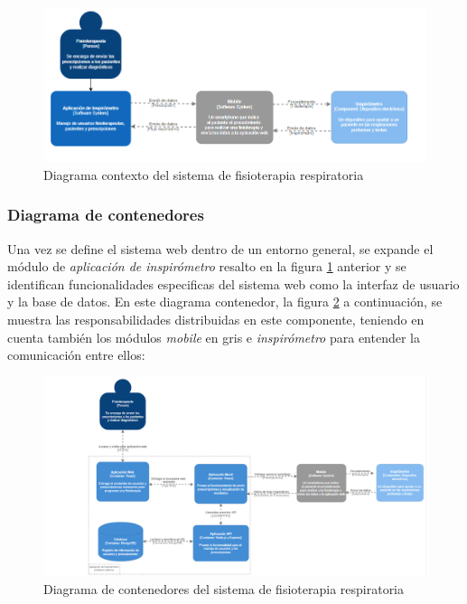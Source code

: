 \documentclass[12pt]{article}
\begin{document}
\begin{figure}[ht]
\centering
\includegraphics[scale=0.85]{imag/L1C4.PNG}
\caption{Diagrama contexto del sistema de fisioterapia respiratoria}
\label{11}
\end{figure}
\FloatBarrier

\subsubsection{Diagrama de contenedores}

Una vez se define el sistema web dentro de un entorno general, se expande el módulo de \textit{aplicación de inspirómetro} resalto en la figura \ref{11} anterior y se identifican funcionalidades especificas del sistema web como la interfaz de usuario y la base de datos. En este diagrama contenedor, la figura \ref{12} a continuación, se muestra las responsabilidades distribuidas en este componente, teniendo en cuenta también los módulos \textit{mobile} en gris e \textit{inspirómetro} para entender la comunicación entre ellos: 

\begin{figure}[ht]
\centering
\includegraphics[scale=0.72]{imag/L2C4.PNG}
\caption{Diagrama de contenedores del sistema de fisioterapia respiratoria}
\label{12}
\end{figure}
\FloatBarrier
\end{document}

